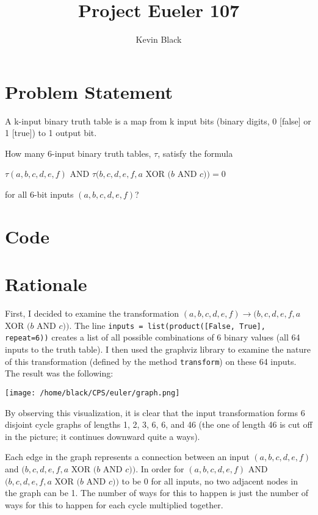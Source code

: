 \documentclass[11pt]{article}
\title{\vspace{-1.5cm}Project Eueler 107}
\author{Kevin Black}
\begin{document}
\maketitle

\section{Problem Statement}

A k-input binary truth table is a map from k input bits (binary digits, 0 [false] or 1 [true]) to 1 output bit.

How many 6-input binary truth tables, $\tau$, satisfy the formula

\begin{center}
	$\tau(a, b, c, d, e, f)$ AND $\tau(b, c, d, e, f, a$ XOR $(b$ AND $c)) = 0$
\end{center}

for all 6-bit inputs $(a, b, c, d, e, f)$? 

\section{Code}


\section{Rationale}
First, I decided to examine the transformation $(a, b, c, d, e, f) \to (b, c, d, e, f, a$ XOR $(b$ AND $c))$. The line \verb!inputs = list(product([False, True], repeat=6))! creates a list of all possible combinations of 6 binary values (all 64 inputs to the truth table). I then used the graphviz library to examine the nature of this transformation (defined by the method \verb!transform!) on these 64 inputs. The result was the following:

\begin{center}
\texttt{[image: /home/black/CPS/euler/graph.png]}
\end{center}

By observing this visualization, it is clear that the input transformation forms 6 disjoint cycle graphs of lengths 1, 2, 3, 6, 6, and 46 (the one of length 46 is cut off in the picture; it continues downward quite a ways).

Each edge in the graph represents a connection between an input $(a, b, c, d, e, f)$ and $(b, c, d, e, f, a$ XOR $(b$ AND $c))$. In order for $(a, b, c, d, e, f)$ AND $(b, c, d, e, f, a$ XOR $(b$ AND $c))$ to be 0 for all inputs, no two adjacent nodes in the graph can be 1. The number of ways for this to happen is just the number of ways for this to happen for each cycle multiplied together.
\end{document}
